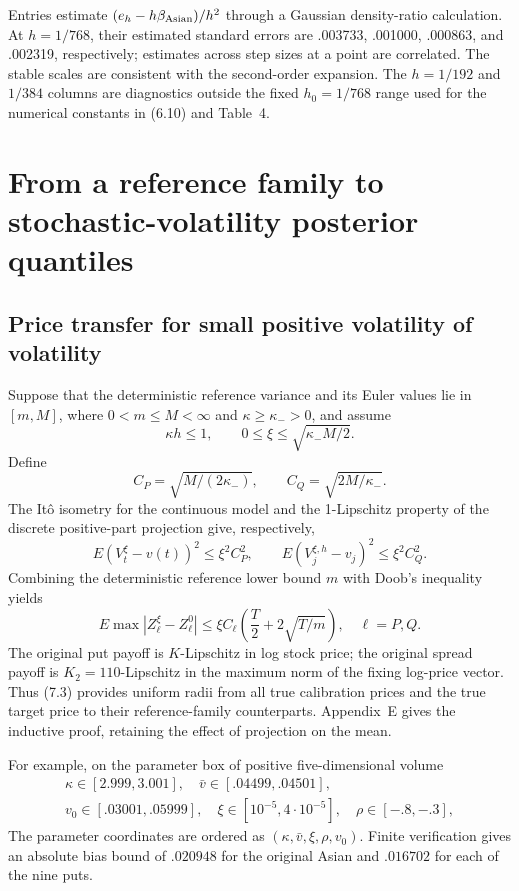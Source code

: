 Entries estimate \((e_h-h\beta_{\rm Asian})/h^2\) through a Gaussian
density-ratio calculation. At \(h=1/768\), their estimated standard errors
are .003733, .001000, .000863, and .002319, respectively; estimates across
step sizes at a point are correlated. The stable scales are consistent with
the second-order expansion. The \(h=1/192\) and \(1/384\) columns are
diagnostics outside the fixed \(h_0=1/768\) range used for the numerical
constants in (6.10) and Table~4.


\section{From a reference family to stochastic-volatility posterior quantiles}

\subsection{Price transfer for small positive volatility of volatility}

Suppose that the deterministic reference variance and its Euler values lie in \([m,M]\),
where \(0<m\le M<\infty\) and \(\kappa\ge\kappa_->0\), and assume
\[
\kappa h\le1,\qquad
0\le\xi\le\sqrt{\kappa_-M/2}.
\tag{7.1}
\]
Define
\[
C_P=\sqrt{M/(2\kappa_-)},\qquad C_Q=\sqrt{2M/\kappa_-}.
\]
The It\^o isometry for the continuous model and the 1-Lipschitz property of the discrete
positive-part projection give, respectively,
\[
E(V_t^\xi-v(t))^2\le\xi^2C_P^2,\qquad
E(V_j^{\xi,h}-v_j)^2\le\xi^2C_Q^2.
\tag{7.2}
\]
Combining the deterministic reference lower bound \(m\) with Doob's inequality yields
\[
E\max|Z_\ell^\xi-Z_\ell^0|
\le\xi C_\ell\left(\frac T2+2\sqrt{T/m}\right),\quad \ell=P,Q.
\tag{7.3}
\]
The original put payoff is \(K\)-Lipschitz in log stock price; the original spread payoff is
\(K_2=110\)-Lipschitz in the maximum norm of the fixing log-price vector.
Thus (7.3) provides uniform radii from all true calibration prices and the true target price
to their reference-family counterparts. Appendix~E gives the inductive proof, retaining
the effect of projection on the mean.

For example, on the parameter box of positive five-dimensional volume
\[
\begin{gathered}
\kappa\in[2.999,3.001],\quad\bar v\in[.04499,.04501],\\
v_0\in[.03001,.05999],\quad \xi\in[10^{-5},4\cdot10^{-5}],
\quad\rho\in[-.8,-.3],
\end{gathered}
\tag{7.4}
\]
The parameter coordinates are ordered as \((\kappa,\bar v,\xi,\rho,v_0)\). Finite verification gives an absolute bias bound of \(.020948\) for the original Asian
and \(.016702\) for each of the nine puts.

